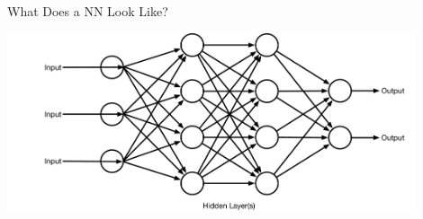 \documentclass[aspectratio=169]{beamer}
\begin{document}
\begin{frame}{What Does a NN Look Like?}

\includegraphics[width=0.9\textwidth]{lectFF/nn.pdf}
\end{frame}
\end{document}
